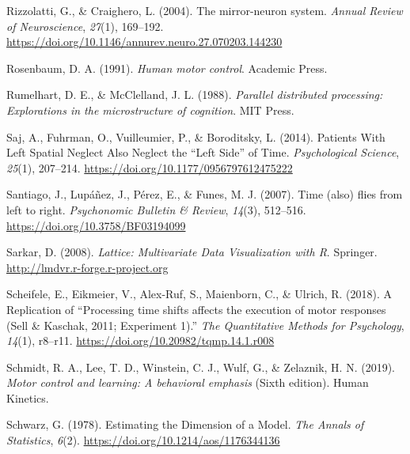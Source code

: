 \documentclass[
  a4paper,12pt,twoside,onecolumn,openright,final,oldfontcommands]{memoir}
\newlength{\cslhangindent}
\newlength{\cslentryspacingunit} %
\newenvironment{CSLReferences}[2] %
 {%
  \setlength{\parindent}{0pt}
  \ifodd #1
  \let\oldpar\par
  \def\par{\hangindent=\cslhangindent\oldpar}
  \fi
  \setlength{\parskip}{#2\cslentryspacingunit}
 }%
 {}
\begin{document}
\begin{CSLReferences}{1}{0}
\leavevmode{}%
Rizzolatti, G., \& Craighero, L. (2004). The mirror-neuron system. \emph{Annual Review of Neuroscience}, \emph{27}(1), 169--192. \url{https://doi.org/10.1146/annurev.neuro.27.070203.144230}

\leavevmode{}%
Rosenbaum, D. A. (1991). \emph{Human motor control}. Academic Press.

\leavevmode{}%
Rumelhart, D. E., \& McClelland, J. L. (1988). \emph{Parallel distributed processing: Explorations in the microstructure of cognition}. MIT Press.

\leavevmode{}%
Saj, A., Fuhrman, O., Vuilleumier, P., \& Boroditsky, L. (2014). Patients {With} {Left} {Spatial} {Neglect} {Also} {Neglect} the {``{Left} {Side}''} of {Time}. \emph{Psychological Science}, \emph{25}(1), 207--214. \url{https://doi.org/10.1177/0956797612475222}

\leavevmode{}%
Santiago, J., Lupáñez, J., Pérez, E., \& Funes, M. J. (2007). Time (also) flies from left to right. \emph{Psychonomic Bulletin \& Review}, \emph{14}(3), 512--516. \url{https://doi.org/10.3758/BF03194099}

\leavevmode{}%
Sarkar, D. (2008). \emph{Lattice: {Multivariate} {Data} {Visualization} with {R}}. Springer. \url{http://lmdvr.r-forge.r-project.org}

\leavevmode{}%
Scheifele, E., Eikmeier, V., Alex-Ruf, S., Maienborn, C., \& Ulrich, R. (2018). A {Replication} of {``{Processing} time shifts affects the execution of motor responses ({Sell} \& {Kaschak}, 2011; {Experiment} 1).''} \emph{The Quantitative Methods for Psychology}, \emph{14}(1), r8--r11. \url{https://doi.org/10.20982/tqmp.14.1.r008}

\leavevmode{}%
Schmidt, R. A., Lee, T. D., Winstein, C. J., Wulf, G., \& Zelaznik, H. N. (2019). \emph{Motor control and learning: A behavioral emphasis} (Sixth edition). Human Kinetics.

\leavevmode{}%
Schwarz, G. (1978). Estimating the {Dimension} of a {Model}. \emph{The Annals of Statistics}, \emph{6}(2). \url{https://doi.org/10.1214/aos/1176344136}


\end{CSLReferences}
\end{document}
